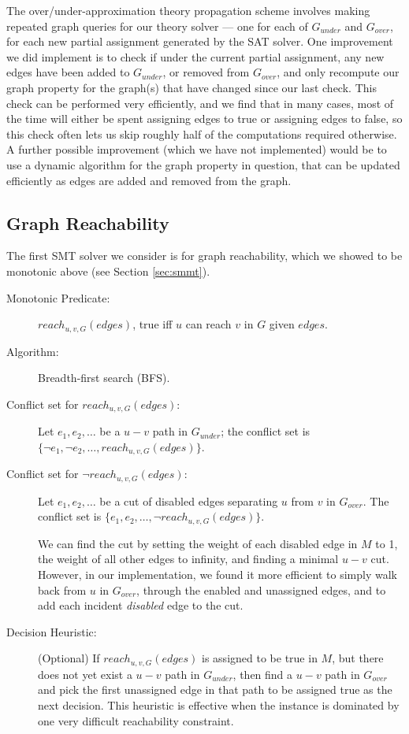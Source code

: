\documentclass[runningheads]{llncs}
\newcommand{\gunder}{G_{under}}
\newcommand{\gover}{G_{over}}
\begin{document}
The over/under-approximation theory propagation scheme involves making
repeated graph queries for our theory solver --- one for each of $\gunder$
and $\gover$, for each new partial assignment generated by the SAT
solver. One improvement we did implement is to check if under the
current partial assignment, any new edges have been added to $\gunder$,
or removed from $\gover$, and only recompute our graph property for
the graph(s) that have changed since our last check.  This check can
be performed very efficiently, and we find that in many cases, most
of the time will either be spent assigning edges to true or assigning
edges to false, so this check often lets us skip roughly half of the
computations required otherwise. A further possible improvement (which
we have not implemented) would be to use a dynamic algorithm for the
graph property in question, that can be updated efficiently as edges
are added and removed from the graph.






\subsection{{Graph Reachability}}
The first SMT solver we consider is for graph reachability, which we showed to be monotonic above (see Section \ref{sec:smmt}).

\begin{description}
\item[Monotonic Predicate:] $reach_{u,v,G}(edges)$, true iff $u$ can reach $v$ in $G$ given $edges$. \item[Algorithm:] Breadth-first search (BFS).
\item[Conflict set for $reach_{u,v,G}(edges)$:] Let $e_1, e_2, \ldots$ be a $u-v$ path in $\gunder$; the conflict set is $\{\lnot e_1, \lnot e_2, \ldots, reach_{u,v,G}(edges)\}$. 

\item[Conflict set for $\lnot reach_{u,v,G}(edges)$:] Let  $e_1, e_2, \ldots$ be a cut of disabled edges separating $u$ from $v$ in $\gover$. The conflict set is $\{e_1, e_2, \ldots, \lnot reach_{u,v,G}(edges)\}$.

We can find the cut by setting the weight of each disabled edge in $M$
to 1, the weight of all other edges to infinity, and finding a minimal
$u-v$ cut. However, in our implementation, we found it more efficient to simply
walk back from $u$ in $\gover$, through the enabled and unassigned edges,
and to add each incident \textit{disabled} edge to the cut.


\item[Decision Heuristic:] (Optional) If $reach_{u,v,G}(edges)$ is assigned to be true in $M$, but there does not yet exist a $u-v$ path in $\gunder$,  then find a $u-v$ path in $\gover$ and pick the first unassigned edge in that path to be assigned true as the next decision. This heuristic is effective when the instance is dominated by one very difficult reachability constraint. 



\end{description}
\end{document}
